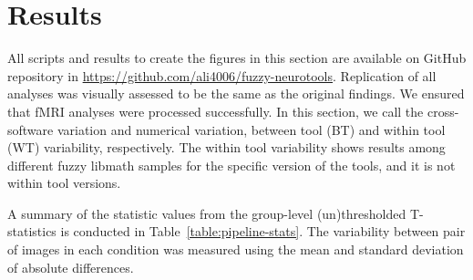 \documentclass[runningheads]{llncs}
\begin{document}




\section{Results}

All scripts and results to create the figures in this section are available on GitHub repository
in \url{https://github.com/ali4006/fuzzy-neurotools}.
Replication of all analyses was visually assessed to be the same as the original findings.
We ensured that fMRI analyses were processed successfully.
In this section, we call the cross-software variation and numerical variation,
between tool (BT) and within tool (WT) variability, respectively. 
The within tool variability shows results among different fuzzy libmath
samples for the specific version of the tools, and it is not within tool versions.


A summary of the statistic values from the group-level (un)thresholded T-statistics is conducted in
Table~\ref{table:pipeline-stats}.
The variability between pair of images in each condition was measured using the mean and standard deviation of absolute differences.
\end{document}
